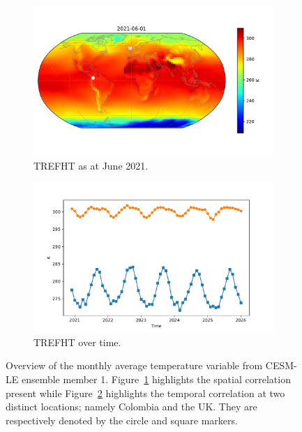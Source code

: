 \begin{figure}[htbp!] 
	\centering
	\begin{subfigure}[b]{0.45\textwidth}
		\includegraphics[width=\textwidth]{TREFHT_example}
		\caption{TREFHT as at June 2021.}
		\label{fig:temp_june}   
	\end{subfigure}             
	\begin{subfigure}[b]{0.45\textwidth}
		\includegraphics[width=\textwidth]{TREFHT_example_temp}
		\caption{TREFHT  over time.}
		\label{fig:temp_temp}
	\end{subfigure}             
	\caption[Overview of Temperature variable]{Overview of the monthly average temperature variable from CESM-LE ensemble member 1. Figure~\ref{fig:temp_june} highlights the spatial correlation present while Figure~\ref{fig:temp_temp} highlights the temporal correlation at two distinct locations; namely Colombia and the UK. They are respectively denoted by the circle and square markers.}
	\label{fig:temp_overview}
\end{figure}

